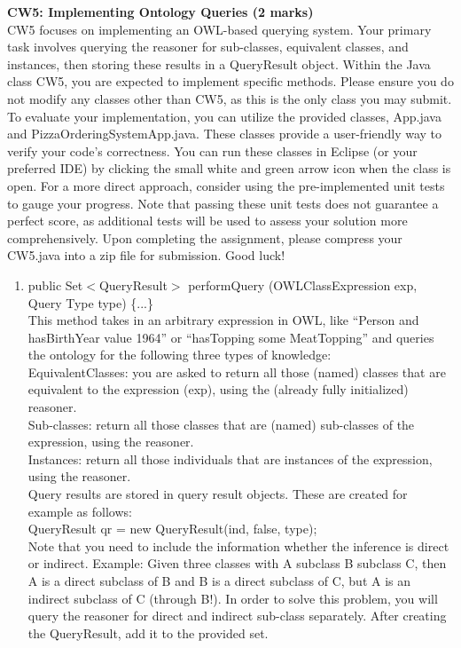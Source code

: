 \documentclass[12pt,a4paper]{article}
\newenvironment{problem}[2][{\color{red}Question}]{\begin{trivlist}
\item[\hskip \labelsep {\bfseries #1}\hskip \labelsep {\bfseries #2.}]}{\end{trivlist}}
\begin{document}
\begin{problem}{{\color{red}5}}
\textbf{CW5: Implementing Ontology Queries (2 marks)}\\
CW5 focuses on implementing an OWL-based querying system. Your primary task involves querying the reasoner for sub-classes, equivalent classes, and instances, then storing these results in a QueryResult object. Within the Java class CW5, you are expected to implement specific methods. Please ensure you do not modify any classes other than CW5, as this is the only class you may submit. To evaluate your implementation, you can utilize the provided classes, App.java and PizzaOrderingSystemApp.java. These classes provide a user-friendly way to verify your code's correctness. You can run these classes in Eclipse (or your preferred IDE) by clicking the small white and green arrow icon when the class is open. For a more direct approach, consider using the pre-implemented unit tests to gauge your progress. Note that passing these unit tests does not guarantee a perfect score, as additional tests will be used to assess your solution more comprehensively. Upon completing the assignment, please compress your CW5.java into a zip file for submission. Good luck!
\begin{enumerate}
\item {\textsf{public Set$<$QueryResult$>$ performQuery (OWLClassExpression exp, Query Type type) \{...\}}}\\
This method takes in an arbitrary expression in OWL, like ``Person and hasBirthYear value 1964'' or ``hasTopping some MeatTopping'' and queries the ontology for the following three types of knowledge:\\
EquivalentClasses: you are asked to return all those (named) classes that are equivalent to the expression (exp), using the (already fully initialized) reasoner.\\
Sub-classes: return all those classes that are (named) sub-classes of the expression, using the reasoner.\\
Instances: return all those individuals that are instances of the expression, using the reasoner.\\
Query results are stored in query result objects. These are created for example as follows:\\
{\textsf{QueryResult qr = new QueryResult(ind, false, type);}}\\
Note that you need to include the information whether the inference is direct or indirect. Example: Given three classes with A subclass B subclass C, then A is a direct subclass of B and B is a direct subclass of C, but A is an indirect subclass of C (through B!). In order to solve this problem, you will query the reasoner for direct and indirect sub-class separately. After creating the QueryResult, add it to the provided set.

\end{enumerate}
\end{problem}
\end{document}
